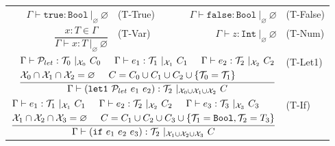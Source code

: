 \documentclass{article}
\begin{document}
\begin{figure}[tb]
    \centering
    \begin{tabular}{rlrl}
        $\Gamma \vdash \mathtt{true} : \mathtt{Bool}\ |_\varnothing\ \varnothing$ & (T-True) &
        $\Gamma \vdash \mathtt{false} : \mathtt{Bool}\ |_\varnothing\ \varnothing$ & (T-False) \vspace{5mm} \\

        $\dfrac{x : T \in \Gamma}{\Gamma \vdash x : T\ |_\varnothing\ \varnothing}$ & (T-Var) &
        $\Gamma \vdash z : \mathtt{Int}\ |_\varnothing\ \varnothing$ & (T-Num) \vspace{5mm} \\

        \multicolumn{3}{r}{
        $\dfrac{
            \begin{aligned}
                &\Gamma \vdash \mathcal{P}_{let} : \mathcal{T}_0\ |_{\mathcal{X}_0}\ C_0 \hspace{5mm}
                    \Gamma \vdash e_1 : \mathcal{T}_1\ |_{\mathcal{X}_1}\ C_1 \hspace{5mm}
                    \Gamma \vdash e_2 : \mathcal{T}_2\ |_{\mathcal{X}_2}\ C_2\\
                &\mathcal{X}_0 \cap \mathcal{X}_1 \cap \mathcal{X}_2 = \varnothing \hspace{5mm}
                    C = C_0 \cup C_1 \cup C_2 \cup \{ \mathcal{T}_0 = \mathcal{T}_1 \}
            \end{aligned}
        }{
            \Gamma \vdash (\mathtt{let1}\ \mathcal{P}_{let}\ e_1\ e_2) : \mathcal{T}_2\ |_{\mathcal{X}_0 \cup \mathcal{X}_1 \cup \mathcal{X}_2}\ C
        }$} & (T-Let1) \vspace{5mm} \\

        \multicolumn{3}{r}{
        $\dfrac{
            \begin{aligned}
                &\Gamma \vdash e_1 : \mathcal{T}_1\ |_{\mathcal{X}_1}\ C_1 \hspace{5mm} \Gamma \vdash e_2 : \mathcal{T}_2\ |_{\mathcal{X}_2}\ C_2 \hspace{5mm} \Gamma \vdash e_3 : \mathcal{T}_3\ |_{\mathcal{X}_3}\ C_3 \\
                &\mathcal{X}_1 \cap \mathcal{X}_2 \cap \mathcal{X}_3 = \varnothing \hspace{5mm} C = C_1 \cup C_2 \cup C_3 \cup \{ \mathcal{T}_1 = \mathtt{Bool}, \mathcal{T}_2 = T_3 \}
            \end{aligned}
        }{
            \Gamma \vdash (\mathtt{if}\ e_1\ e_2\ e_3) : \mathcal{T}_2\ |_{\mathcal{X}_1 \cup \mathcal{X}_2 \cup \mathcal{X}_3}\ C
        }$} & (T-If) \vspace{5mm} \\


\end{tabular}
\end{figure}
\end{document}
